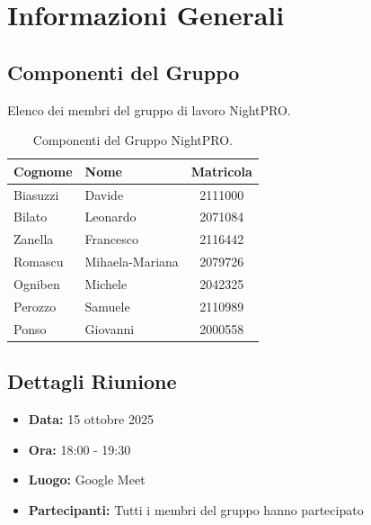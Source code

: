 \newpage
\tableofcontents %
\pagestyle{fancy} %

\newpage
\section{Informazioni Generali}

\subsection{Componenti del Gruppo}
Elenco dei membri del gruppo di lavoro NightPRO.

\begin{table}[h!]
\centering
\begin{tabular}{@{}llc@{}}
\toprule
\textbf{Cognome} & \textbf{Nome} & \textbf{Matricola} \\
\midrule
Biasuzzi & Davide & 2111000 \\
Bilato & Leonardo & 2071084 \\
Zanella & Francesco & 2116442 \\
Romascu & Mihaela-Mariana & 2079726 \\
Ogniben & Michele & 2042325 \\
Perozzo & Samuele & 2110989 \\
Ponso & Giovanni & 2000558 \\
\bottomrule
\end{tabular}
\caption{Componenti del Gruppo NightPRO.}
\end{table}

\subsection{Dettagli Riunione}
\begin{itemize}
    \item \textbf{Data:} 15 ottobre 2025
    \item \textbf{Ora:} 18:00 - 19:30
    \item \textbf{Luogo:} Google Meet
    \item \textbf{Partecipanti:} Tutti i membri del gruppo hanno partecipato
\end{itemize}


